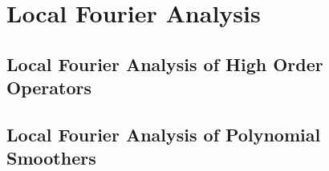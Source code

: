 \chapter{Local Fourier Analysis}\label{ch:LocalFourierAnalysis}


\section{Local Fourier Analysis of High Order Operators}\label{sec:lfahighorder}


\section{Local Fourier Analysis of Polynomial Smoothers}\label{sec:lfasmoothers}

